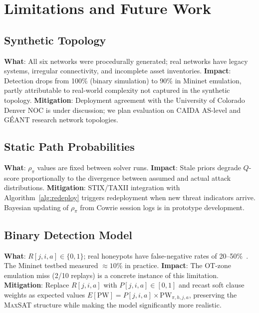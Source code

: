\documentclass[journal]{IEEEtran}
\newcommand{\MAXSAT}{\textsc{MaxSAT}}
\newcommand{\qscore}{$Q$-score}
\begin{document}
\FloatBarrier
\section{Limitations and Future Work}
\label{sec:limitations}

\subsection{Synthetic Topology}
\label{sec:limitations:topology}
\textbf{What}: All six networks were procedurally generated; real
networks have legacy systems, irregular connectivity, and incomplete
asset inventories.
\textbf{Impact}: Detection drops from 100\% (binary simulation) to
90\% in Mininet emulation, partly attributable to real-world
complexity not captured in the synthetic topology.
\textbf{Mitigation}: Deployment agreement with the University of
Colorado Denver NOC is under discussion; we plan evaluation on
CAIDA AS-level and G\'EANT research network topologies.

\subsection{Static Path Probabilities}
\textbf{What}: $\rho_\pi$ values are fixed between solver runs.
\textbf{Impact}: Stale priors degrade \qscore{} proportionally to
the divergence between assumed and actual attack distributions.
\textbf{Mitigation}: STIX/TAXII integration with
Algorithm~\ref{alg:redeploy} triggers redeployment when new threat
indicators arrive. Bayesian updating of $\rho_\pi$ from Cowrie
session logs is in prototype development.

\subsection{Binary Detection Model}
\label{sec:limitations:binary}
\textbf{What}: $R[j,i,a]\in\{0,1\}$; real honeypots have
false-negative rates of 20--50\%~\cite{huang2019}. The Mininet
testbed measured $\approx10\%$ in practice.
\textbf{Impact}: The OT-zone emulation miss (2/10 replays) is a
concrete instance of this limitation.
\textbf{Mitigation}: Replace $R[j,i,a]$ with $P[j,i,a]\in[0,1]$
and recast soft clause weights as expected values
$E[\mathrm{PW}]=P[j,i,a]\times\mathrm{PW}_{\pi,h,j,a}$, preserving
the \MAXSAT{} structure while making the model significantly more
realistic.
\end{document}
